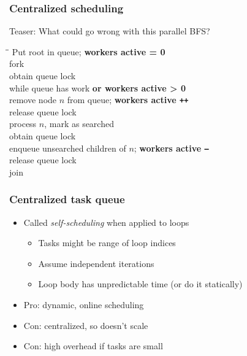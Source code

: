 \documentclass{beamer}
\begin{document}
\begin{frame}
  \frametitle{Centralized scheduling}

  Teaser: What could go wrong with this parallel BFS?
  \begin{tabbing}
    \quad \= \quad \= \kill
    Put root in queue; {\bf workers active = 0} \\
    fork \\
    \> obtain queue lock \\
    \> while queue has work {\bf or workers active > 0} \\
    \> \> remove node $n$ from queue; {\bf workers active {\tt ++}} \\
    \> \> release queue lock \\
    \> \> process $n$, mark as searched \\
    \> \> obtain queue lock \\
    \> \> enqueue unsearched children of $n$; {\bf workers
      active {\tt --}}\\
    \> release queue lock \\
    join
  \end{tabbing}

\end{frame}


\begin{frame}
  \frametitle{Centralized task queue}

  \begin{itemize}
  \item Called {\em self-scheduling} when applied to loops
    \begin{itemize}
    \item Tasks might be range of loop indices
    \item Assume independent iterations
    \item Loop body has unpredictable time (or do it statically)
    \end{itemize}
  \item Pro: dynamic, online scheduling
  \item Con: centralized, so doesn't scale
  \item Con: high overhead if tasks are small
  \end{itemize}

\end{frame}
\end{document}
